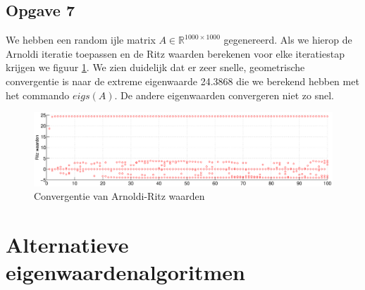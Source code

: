 \documentclass[a4paper, 12pt, titlepage]{report}
\begin{document}
\subsection{Opgave 7}
We hebben een random ijle matrix $A \in \mathbb{R}^{1000\times1000}$ gegenereerd. Als we hierop de Arnoldi iteratie toepassen en de Ritz waarden berekenen voor elke iteratiestap krijgen we figuur \ref{arnoldiGraph}. We zien duidelijk dat er zeer snelle, geometrische convergentie is naar de extreme eigenwaarde 24.3868 die we berekend hebben met het commando $eigs(A)$. De andere eigenwaarden convergeren niet zo snel. 
\begin{figure}[htb]
	\begin{center}
	 \includegraphics[width=\textwidth]{arnoldi.eps}
	\caption{Convergentie van Arnoldi-Ritz waarden}
	\label{arnoldiGraph}
	\end{center}

	
\end{figure}
\section{Alternatieve eigenwaardenalgoritmen}
\end{document}
